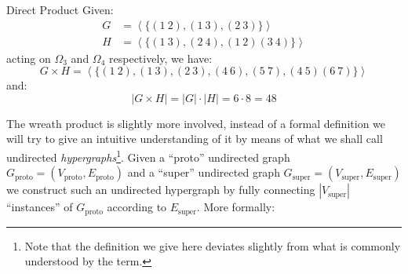 \begin{exmp}[label=exmp:direct_product]{Direct Product}
  Given:
  \begin{align*}
    G &= \left<\{(1\ 2), (1\ 3), (2\ 3)\}\right> \\
    H &= \left<\{(1\ 3), (2\ 4), (1\ 2)(3\ 4)\}\right>
  \end{align*}
  acting on $\Omega_3$ and $\Omega_4$ respectively, we have:
  \begin{equation*}
    G \times H = \left<\{(1\ 2), (1\ 3), (2\ 3), (4\ 6), (5\ 7), (4\ 5)(6\ 7)\}\right>
  \end{equation*}
  and:
  \begin{equation*}
    |G \times H| = |G| \cdot |H| = 6 \cdot 8 = 48
  \end{equation*}
\end{exmp}
%
The wreath product is slightly more involved, instead of a formal definition we
will try to give an intuitive understanding of it by means of what we shall
call undirected \textit{hypergraphs}\footnote{Note that the definition we give
here deviates slightly from what is commonly understood by the term.}. Given a
``proto'' undirected graph $G_{\mathrm{proto}} = (V_{\mathrm{proto}},
E_{\mathrm{proto}})$ and a ``super'' undirected graph $G_{\mathrm{super}} =
(V_{\mathrm{super}}, E_{\mathrm{super}})$ we construct such an undirected
hypergraph by fully connecting $|V_{\mathrm{super}}|$ ``instances'' of
$G_{\mathrm{proto}}$ according to $E_{\mathrm{super}}$. More formally:

